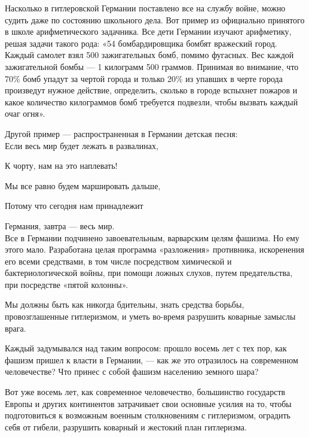 \documentclass[12pt, a4paper, openany]{book}
\begin{document}
Насколько в гитлеровской Германии поставлено все на службу войне, можно судить даже по состоянию школьного дела. Вот пример из официально принятого в школе арифметического задачника. Все дети Германии изучают арифметику, решая задачи такого рода: «54 бомбардировщика бомбят вражеский город. Каждый самолет взял 500 зажигательных бомб, помимо фугасных. Вес каждой зажигательной бомбы — 1 килограмм 500 граммов. Принимая во внимание, что 70\% бомб упадут за чертой города и только 20\% из упавших в черте города произведут нужное действие, определить, сколько в городе вспыхнет пожаров и какое количество килограммов бомб требуется подвезли, чтобы вызвать каждый очаг огня».

Другой пример — распространенная в Германии детская песня:
\ \\


\hangindent=2.5cm  Если весь мир будет лежать в развалинах,

\hangindent=2.5cm  К чорту, нам на это наплевать!

\hangindent=2.5cm  Мы все равно будем маршировать дальше,

\hangindent=2.5cm  Потому что сегодня нам принадлежит

\hangindent=2.5cm  Германия, завтра — весь мир.
\ \\

Все в Германии подчинено завоевательным, варварским целям фашизма. Но ему этого мало. Разработана целая программа «разложения» противника, искоренения его всеми средствами, в том числе посредством химической и бактериологической войны, при помощи ложных слухов, путем предательства, при посредстве «пятой колонны».

Мы должны быть как никогда бдительны, знать средства борьбы, провозглашенные гитлеризмом, и уметь во-время разрушить коварные замыслы врага.

Каждый задумывался над таким вопросом: прошло восемь лет с тех пор, как фашизм пришел к власти в Германии, — как же это отразилось на современном человечестве? Что принес с собой фашизм населению земного шара?

Вот уже восемь лет, как современное человечество, большинство государств Европы и других континентов затрачивает свои основные усилия на то, чтобы подготовиться к возможным военным столкновениям с гитлеризмом, оградить себя от гибели, разрушить коварный и жестокий план гитлеризма.
\end{document}
